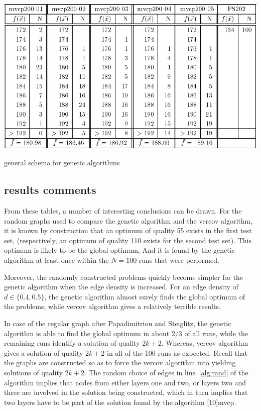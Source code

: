\documentclass[12pt]{article}
\begin{document}
\begin{table}[!htbp]
\centering
\includegraphics[width=1\textwidth]{t4}
\caption{general schema for genetic algorithms}
\label{tbl:t4}
\end{table}

\subsection{results comments}
From these tables, a number of interesting conclusions
can be drawn. For the random graphs used to compare the
genetic algorithm and the vercov algorithm,
it is known by construction that an optimum of quality 55 exists in the first test set,
(respectively, an optimum of quality 110 exists for the second test set). This optimum is likely to be the
global optimum, And it is found by the genetic
algorithm at least once within the $N = 100$ runs that were performed.

Moreover, the randomly constructed problems quickly
become simpler for the genetic algorithm when the edge
density is increased. For an edge density of $d \in \{0.4, 0.5\}$, the
genetic algorithm almost surely finds the global optimum
of the problems, while vercov algorithm gives a relatively terrible results.

In case of the regular graph after Papadimitriou and
Steiglitz, the genetic algorithm is able to find the global
optimum in about $2/3$ of all runs, while the remaining
runs identify a solution of quality $2k + 2$.
Whereas, vercov algorithm gives a solution of quality $2k + 2$ in all of the 100 runs as expected.
Recall that the graphs are constructed
so as to force the vercov algorithm into yielding solutions
of quality $2k + 2$.
The random choice of edges in line~\ref{alg:rand} of the algorithm implies that nodes from either layers one and two, or layers two and three are involved in the solution being constructed, which in turn implies that two layers have to be part of the solution found by the algorithm [10]mvcp.
\end{document}
